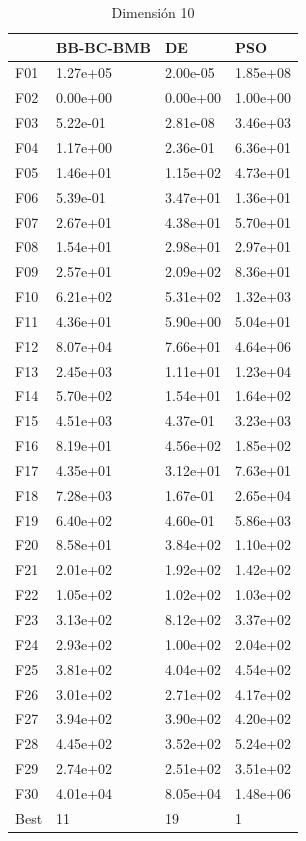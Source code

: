 \begin{table}[H]
    \begin{minipage}{.5\linewidth}
      \caption{Dimensión 10}
      \centering
      \begin{tabular}{llll}
        \toprule
        {} & BB-BC-BMB &        DE &       PSO \\
        \midrule
        F01  &  1.27e+05 &  2.00e-05 &  1.85e+08 \\
        F02  &  0.00e+00 &  0.00e+00 &  1.00e+00 \\
        F03  &  5.22e-01 &  2.81e-08 &  3.46e+03 \\
        F04  &  1.17e+00 &  2.36e-01 &  6.36e+01 \\
        F05  &  1.46e+01 &  1.15e+02 &  4.73e+01 \\
        F06  &  5.39e-01 &  3.47e+01 &  1.36e+01 \\
        F07  &  2.67e+01 &  4.38e+01 &  5.70e+01 \\
        F08  &  1.54e+01 &  2.98e+01 &  2.97e+01 \\
        F09  &  2.57e+01 &  2.09e+02 &  8.36e+01 \\
        F10  &  6.21e+02 &  5.31e+02 &  1.32e+03 \\
        F11  &  4.36e+01 &  5.90e+00 &  5.04e+01 \\
        F12  &  8.07e+04 &  7.66e+01 &  4.64e+06 \\
        F13  &  2.45e+03 &  1.11e+01 &  1.23e+04 \\
        F14  &  5.70e+02 &  1.54e+01 &  1.64e+02 \\
        F15  &  4.51e+03 &  4.37e-01 &  3.23e+03 \\
        F16  &  8.19e+01 &  4.56e+02 &  1.85e+02 \\
        F17  &  4.35e+01 &  3.12e+01 &  7.63e+01 \\
        F18  &  7.28e+03 &  1.67e-01 &  2.65e+04 \\
        F19  &  6.40e+02 &  4.60e-01 &  5.86e+03 \\
        F20  &  8.58e+01 &  3.84e+02 &  1.10e+02 \\
        F21  &  2.01e+02 &  1.92e+02 &  1.42e+02 \\
        F22  &  1.05e+02 &  1.02e+02 &  1.03e+02 \\
        F23  &  3.13e+02 &  8.12e+02 &  3.37e+02 \\
        F24  &  2.93e+02 &  1.00e+02 &  2.04e+02 \\
        F25  &  3.81e+02 &  4.04e+02 &  4.54e+02 \\
        F26  &  3.01e+02 &  2.71e+02 &  4.17e+02 \\
        F27  &  3.94e+02 &  3.90e+02 &  4.20e+02 \\
        F28  &  4.45e+02 &  3.52e+02 &  5.24e+02 \\
        F29  &  2.74e+02 &  2.51e+02 &  3.51e+02 \\
        F30  &  4.01e+04 &  8.05e+04 &  1.48e+06 \\
        Best &        11 &        19 &         1 \\
        \bottomrule
        \end{tabular}
        

\end{minipage}
\end{table}
